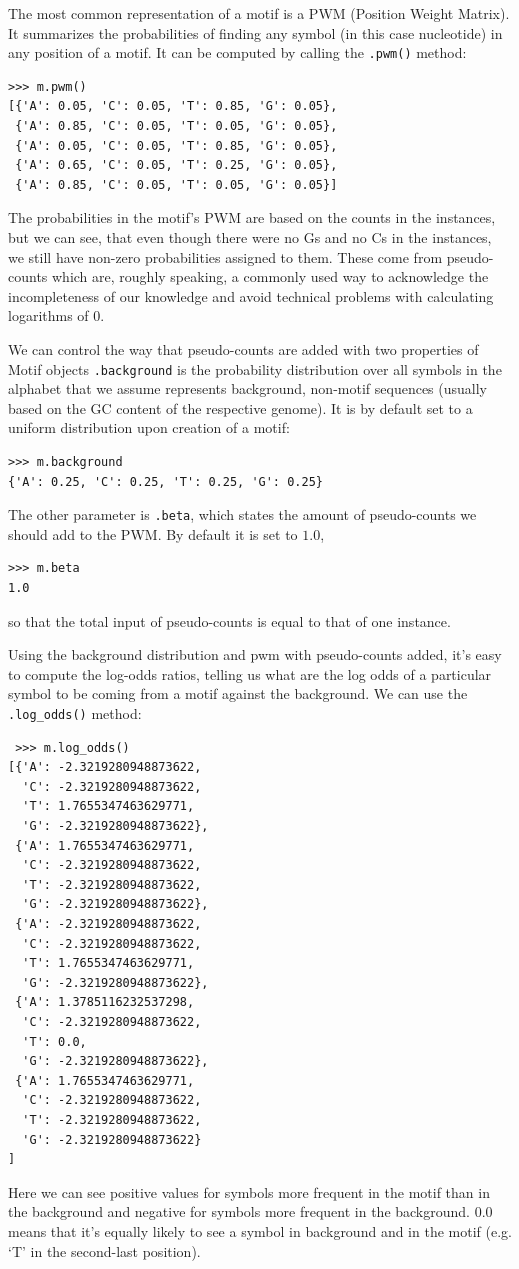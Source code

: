 \documentclass{report}
\begin{document}
The most common representation of a motif is a PWM (Position Weight
Matrix). It summarizes the probabilities of finding any symbol (in
this case nucleotide) in any position of a motif. It can be computed by calling the \verb|.pwm()| method:
\begin{verbatim}
>>> m.pwm()
[{'A': 0.05, 'C': 0.05, 'T': 0.85, 'G': 0.05}, 
 {'A': 0.85, 'C': 0.05, 'T': 0.05, 'G': 0.05}, 
 {'A': 0.05, 'C': 0.05, 'T': 0.85, 'G': 0.05}, 
 {'A': 0.65, 'C': 0.05, 'T': 0.25, 'G': 0.05}, 
 {'A': 0.85, 'C': 0.05, 'T': 0.05, 'G': 0.05}]
\end{verbatim}
The probabilities in the motif's PWM are based on the counts in the
instances, but we can see, that even though there were no Gs and no Cs
in the instances, we still have non-zero probabilities assigned to
them. These come from pseudo-counts which are, roughly speaking, a
commonly used way to acknowledge the incompleteness of our knowledge
and avoid technical problems with calculating logarithms of $0$.

We can control the way that pseudo-counts are added with two
properties of Motif objects \verb|.background| is the probability
distribution over all symbols in the alphabet that we assume represents background, non-motif sequences (usually based on the GC content of the respective
genome). It is by default set to a uniform distribution upon creation of a motif:
\begin{verbatim}
>>> m.background  
{'A': 0.25, 'C': 0.25, 'T': 0.25, 'G': 0.25}
\end{verbatim}
The other parameter is \verb|.beta|, which states the amount of
pseudo-counts we should add to the PWM. By default it is set to $1.0$,
\begin{verbatim}
>>> m.beta
1.0
\end{verbatim}
so that the total input of pseudo-counts is equal to that of one instance. 

Using the background distribution and pwm with pseudo-counts added,
it's easy to compute the log-odds ratios, telling us what are the log
odds of a particular symbol to be coming from a motif against the
background. We can use the \verb|.log_odds()| method:

\begin{verbatim}
 >>> m.log_odds() 
[{'A': -2.3219280948873622, 
  'C': -2.3219280948873622, 
  'T': 1.7655347463629771, 
  'G': -2.3219280948873622}, 
 {'A': 1.7655347463629771, 
  'C': -2.3219280948873622, 
  'T': -2.3219280948873622, 
  'G': -2.3219280948873622}, 
 {'A': -2.3219280948873622, 
  'C': -2.3219280948873622, 
  'T': 1.7655347463629771, 
  'G': -2.3219280948873622}, 
 {'A': 1.3785116232537298, 
  'C': -2.3219280948873622, 
  'T': 0.0, 
  'G': -2.3219280948873622}, 
 {'A': 1.7655347463629771, 
  'C': -2.3219280948873622, 
  'T': -2.3219280948873622, 
  'G': -2.3219280948873622}
]
\end{verbatim}
Here we can see positive values for symbols more frequent in the motif
than in the background and negative for symbols more frequent in the
background. $0.0$ means that it's equally likely to see a symbol in
background and in the motif (e.g. `T' in the second-last position).
\end{document}
